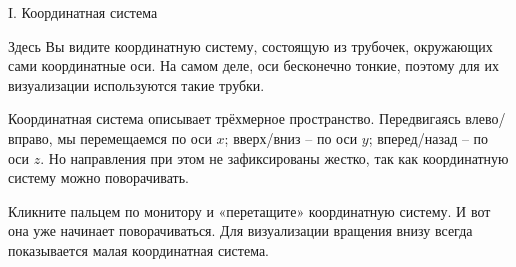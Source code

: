 \documentclass[ru]{./../../common/SurferDesc}%
\begin{document}
\footnotesize
%


\begin{surferPage}
  \begin{surferTitle}I. Координатная система\end{surferTitle}
   \begin{surferText}
   
Здесь Вы видите координатную систему, состоящую из трубочек, окружающих сами координатные оси. На самом деле, оси бесконечно тонкие, поэтому для их визуализации используются такие трубки.

Координатная система описывает трёхмерное пространство. Передвигаясь влево/вправо, мы перемещаемся по оси $x$; вверх/вниз – по оси $y$; вперед/назад – по оси $z$. Но направления при этом не зафиксированы жестко, так как координатную систему можно поворачивать.

Кликните пальцем по монитору и «перетащите» координатную систему. И вот она уже начинает поворачиваться. Для визуализации вращения внизу всегда показывается малая координатная система.
  \end{surferText}
\end{surferPage}
\end{document}
